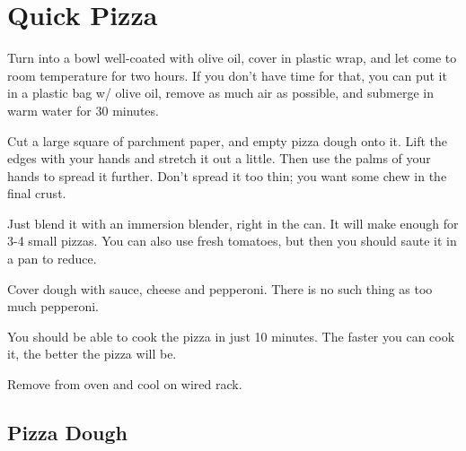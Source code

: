 \section{Quick Pizza}
\begin{recipe}



Turn into a bowl well-coated with olive oil, cover in plastic wrap, and let
come to room temperature for two hours. If you don't have time for that, you
can put it in a plastic bag w/ olive oil, remove as much air as possible, and
submerge in warm water for 30 minutes.

Cut a large square of parchment paper, and empty pizza dough onto it. Lift the
edges with your hands and stretch it out a little. Then use the palms of your
hands to spread it further. Don't spread it too thin; you want some chew in
the final crust.


Just blend it with an immersion blender, right in the can. It will make enough
for 3-4 small pizzas. You can also use fresh tomatoes, but then you should saute it in a pan to reduce.


Cover dough with sauce, cheese and pepperoni. There is no such thing as too much
pepperoni.

You should be able to cook the pizza in just 10 minutes.
The faster you can cook it, the better the pizza will be.

Remove from oven and cool on wired rack.

\subsection{Pizza Dough}


\end{recipe}
